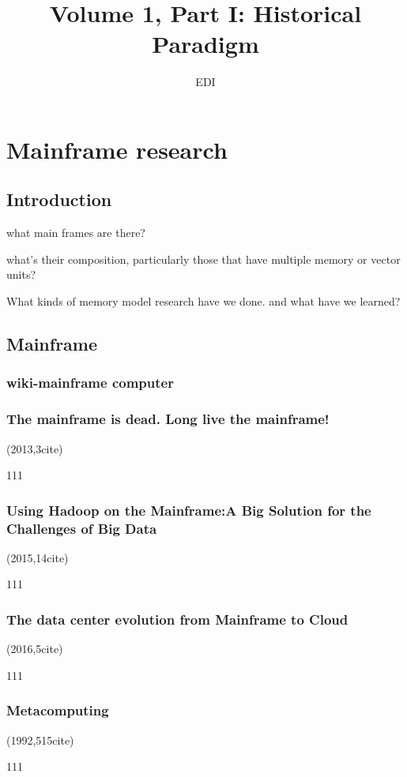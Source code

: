 \documentclass[a4paper,twoside]{scrbook}
\begin{document}
\title{Volume 1, Part I: Historical Paradigm}
\author{EDI}
\frontmatter
\maketitle
\tableofcontents
\mainmatter


\chapter{Mainframe research}
\section{Introduction}

what main frames are there?

what's their composition, particularly those that have multiple memory or vector units?


What kinds of memory model research have we done. and what have we learned?


\section{Mainframe}
\subsection{wiki-mainframe computer\cite{mainframewiki}}
\subsection{The mainframe is dead. Long live the mainframe!\cite{sagers2013mainframe}}
(2013,3cite)\par
111
\subsection{Using Hadoop on the Mainframe:A Big Solution for the Challenges of Big Data \cite{seay2015using}}
(2015,14cite)\par
111
\subsection{The data center evolution from Mainframe to Cloud \cite{zlatanov2016data}}
(2016,5cite)\par
111
\subsection{Metacomputing \cite{smarr1992metacomputing}}
(1992,515cite)\par
111
\end{document}
